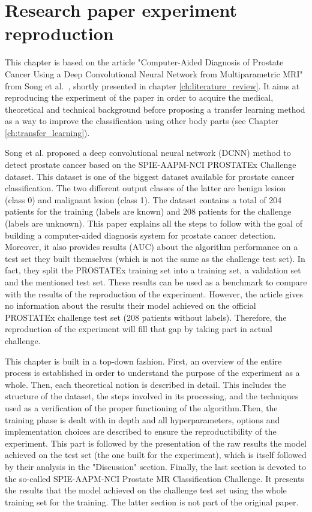 
\chapter{Research paper experiment reproduction}
\label{ch:paper_reproduction}
\setlength{\marginparwidth}{3cm}\leavevmode {}This chapter is based on the article "Computer-Aided Diagnosis of Prostate Cancer Using a Deep Convolutional Neural Network from Multiparametric MRI" from Song et al.~\cite{07}, shortly presented in chapter \ref{ch:literature_review}. It aims at reproducing the experiment of the paper in order to acquire the medical, theoretical and technical background before proposing a transfer learning method as a way to improve the classification using other body parts (see Chapter \ref{ch:transfer_learning}).

Song et al. \cite{07} proposed a deep convolutional neural network (DCNN) method to detect prostate cancer based on the SPIE-AAPM-NCI PROSTATEx Challenge dataset. This dataset is one of the biggest dataset available for prostate cancer classification. The two different output classes of the latter are benign lesion (class 0) and malignant lesion (class 1). The dataset contains a total of 204 patients for the training (labels are known) and 208 patients for the challenge (labels are unknown). This paper explains all the steps to follow with the goal of building a computer-aided diagnosis system for prostate cancer detection. Moreover, it also provides results (AUC) about the algorithm performance on a test set they built themselves (which is not the same as the challenge test set). In fact, they split the PROSTATEx training set into a training set, a validation set and the mentioned test set. These results can be used as a benchmark to compare with the results of the reproduction of the experiment. However, the article gives no information about the results their model achieved on the official PROSTATEx challenge test set (208 patients without labels). Therefore, the reproduction of the experiment will fill that gap by taking part in actual challenge.

This chapter is built in a top-down fashion. First, an overview of the entire process is established in order to understand the purpose of the experiment as a whole. Then, each theoretical notion is described in detail. This includes the structure of the dataset, the steps involved in its processing, and the techniques used as a verification of the proper functioning of the algorithm.Then, the training phase is dealt with in depth and all hyperparameters, options and implementation choices are described to ensure the reproductibility of the experiment. This part is followed by the presentation of the raw results the model achieved on the test set (the one built for the experiment), which is itself followed by their analysis in the "Discussion" section. Finally, the last section is devoted to the so-called SPIE-AAPM-NCI Prostate MR Classification Challenge. It presents the results that the model achieved on the challenge test set using the whole training set for the training. The latter section is not part of the original paper.


